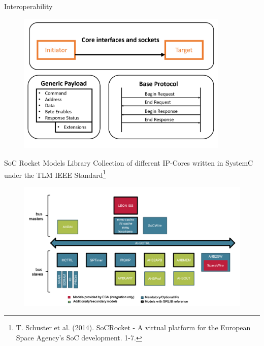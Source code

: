\begin{frame}{Interoperability}
\begin{figure}
\label{fig:int}
\centering
\includegraphics[width=0.9\textwidth]{pictures/Interoperability.PNG}
\end{figure}
\end{frame}
\begin{frame}{SoC Rocket Models Library}
Collection of different IP-Cores written in SystemC under the TLM IEEE Standard\footnote{T. Schuster et al. (2014). SoCRocket - A virtual platform for the European Space Agency's SoC development. 1-7.}
\begin{figure}
\label{fig:Lib}
\centering
\includegraphics[width=1\textwidth]{pictures/ModelsLibrary.PNG}
\end{figure}
\end{frame}
